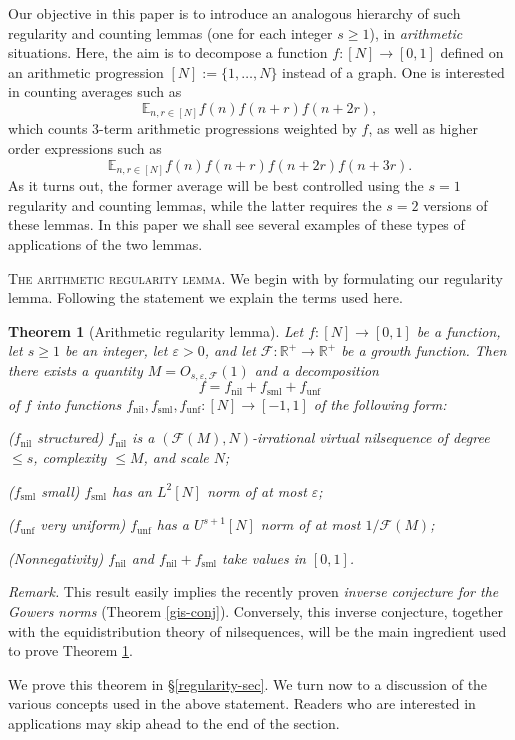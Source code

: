\documentclass[11pt,reqno]{amsart}
\numberwithin{equation}{section}
\theoremstyle{plain}
\newtheorem{theorem}[subsection]{Theorem}
\theoremstyle{definition}
\renewcommand{\leq}{\leqslant}
\renewcommand{\geq}{\geqslant}
\newcommand\E{{\mathbb{E}}}
\newcommand\R{\mathbb{R}}
\newcommand\1{{\bf 1}}
\newcommand\2{{\bf 2}}
\newcommand\eps{\varepsilon}
\newcommand\nil{{\operatorname{nil}}}
\newcommand\sml{{\operatorname{sml}}}
\newcommand\unf{{\operatorname{unf}}}
\newcommand\Grow{{\mathcal F}}
\begin{document}
Our objective in this paper is to introduce an analogous hierarchy of such regularity and counting lemmas (one for each integer $s \geq 1$), in \emph{arithmetic} situations. Here, the aim is to decompose a function $f: [N] \to [0,1]$ defined on an arithmetic progression $[N] := \{1,\ldots,N\}$ instead of a graph. One is interested in counting averages such as
$$
\E_{n,r \in [N]} f(n) f(n+r) f(n+2r),
$$
which counts $3$-term arithmetic progressions weighted by $f$, as well as higher order expressions such as
$$
\E_{n,r \in [N]} f(n) f(n+r) f(n+2r) f(n+3r).
$$
As it turns out, the former average will be best controlled using the $s=1$ regularity and counting lemmas, while the latter requires the $s=2$ versions of these lemmas.  In this paper we shall see several examples of these types of applications of the two lemmas.\vspace{11pt}

\textsc{The arithmetic regularity lemma.} We begin with by formulating our regularity lemma. Following the statement we explain the terms used here.

\begin{theorem}[Arithmetic regularity lemma]\label{strong-reg}
Let $f: [N] \to [0,1]$ be a function, let $s \geq 1$ be an integer, let $\eps > 0$, and let $\Grow: \R^+ \to \R^+$ be a growth function.  Then there exists a quantity $M = O_{s,\eps,\Grow}(1)$ and a decomposition 
$$ f = f_{\nil} + f_{\sml} + f_{\unf}$$
of $f$ into functions $f_\nil, f_\sml, f_\unf: [N] \to [-1,1]$ of the following form:

\textup{(}$f_\nil$ structured\textup{)} $f_\nil$ is a $(\Grow(M),N)$-irrational virtual nilsequence of degree $\leq s$, complexity $\leq M$, and scale $N$;

\textup{(}$f_\sml$ small\textup{)} $f_\sml$ has an $L^2[N]$ norm of at most $\eps$;

\textup{(}$f_\unf$ very uniform\textup{)} $f_\unf$ has a $U^{s+1}[N]$ norm of at most $1/\Grow(M)$;

\textup{(}Nonnegativity\textup{)} $f_{\nil}$ and $f_\nil + f_\sml$ take values in $[0,1]$.
\end{theorem}

\emph{Remark.} This result easily implies the recently proven \emph{inverse conjecture for the Gowers norms} (Theorem \ref{gis-conj}).  Conversely, this inverse conjecture, together with the equidistribution theory of nilsequences, will be the main ingredient used to prove Theorem \ref{strong-reg}.


We prove this theorem in \S  \ref{regularity-sec}.  We turn now to a discussion of the various concepts used in the above statement.  Readers who are interested in applications may skip ahead to the end of the section.
\end{document}
